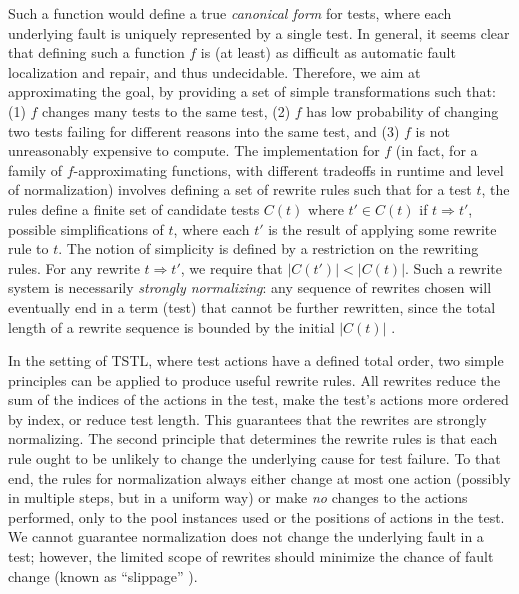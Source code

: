 Such a function would define a true \emph{canonical form} for tests, where each underlying fault is uniquely represented by a single
test.  In general, it seems clear that defining such a function
$f$ is (at least) as difficult as automatic fault localization and
repair, and thus undecidable.  Therefore, we aim at approximating the
goal, by providing a set of simple transformations such that: (1) $f$
changes many tests to the same test, (2) $f$ has low probability of
changing two tests failing for different reasons into the same test,
and (3) $f$ is not unreasonably expensive to compute.  The implementation
for $f$ (in fact, for a family of $f$-approximating functions, with
different tradeoffs in runtime and level of normalization) involves
defining a set of rewrite rules such that for a test $t$, the rules
define a finite set of candidate tests $C(t)$ where $t' \in C(t)$  if $t \Rightarrow t'$, possible
simplifications of $t$, where each $t'$ is the result of applying some
rewrite rule to $t$.  The notion of simplicity is defined by a
restriction on the rewriting rules.  For any rewrite $t \Rightarrow t'$, we require that $|C(t')| < |C(t)|$.  Such
a rewrite system is necessarily \emph{strongly normalizing}: any
sequence of rewrites chosen will eventually end in a term (test)
that cannot be further rewritten, since the total length of a rewrite
sequence is bounded by the initial $|C(t)|$ \cite{term1}.


In the setting of TSTL, where test actions have a defined total
order, two simple principles can be applied to produce useful
rewrite rules.  All rewrites reduce the sum of the
indices of the actions in the test, make the test's
actions more ordered by index, or reduce test length.  This guarantees that the rewrites are
strongly normalizing.
The second principle that determines the rewrite rules is that each
rule ought to be unlikely to change the underlying cause for test
failure.  To that end, the rules for normalization always either change at most
one action (possibly in multiple steps, but in a uniform way) or make
\emph{no} changes to the actions performed, only to the pool instances used or the
positions of actions in the test.  We cannot guarantee
normalization does not change the underlying fault in a test; however,
the limited scope of rewrites should minimize the chance of fault
change (known as ``slippage'' \cite{PLDI13,slippage}).


